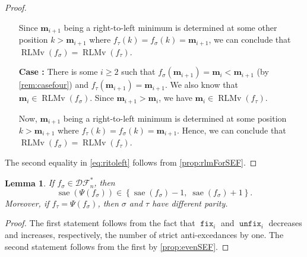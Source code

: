 \documentclass[reqno]{amsart}
\newtheorem{lemma}[theorem]{Lemma}
\theoremstyle{definition}
\newcommand{\DSEF}{\mathcal{DF}}%
\newcommand{\fretherD}{\Psi}
\newcommand{\img}{\mathbf{m}}
\DeclareMathOperator{\RLMv}{RLMv}
\DeclareMathOperator{\aexc}{sae} %
\DeclareMathOperator{\fixMap}{\mathtt{fix}}
\DeclareMathOperator{\unfixMap}{\mathtt{unfix}}
\begin{document}
\begin{proof}
\begin{enumerate}[leftmargin=2cm]
	Since $\img_{i+1}$ being a right-to-left minimum is determined at some other
	position $k>\img_{i+1}$ where $f_\tau(k)=f_\sigma(k)=\img_{i+1}$,
	we can conclude that $\RLMv(f_\sigma)=\RLMv(f_\tau)$.
	
	\item[\textbf{Case \caseFour[i]:}]
	There is some $i\geq 2$ such that $f_\sigma(\img_{i+1})=\img_i<\img_{i+1}$ (by \cref{rem:casefour})
	and $f_\tau(\img_{i+1})=\img_{i+1}$.
	We also know that $\img_i\in\RLMv(f_\sigma)$. 
	Since $\img_{i+1}>\img_i$, we have $\img_i\in\RLMv(f_\tau)$.
	
	Now, $\img_{i+1}$ being a right-to-left minimum
	is determined at some position $k>\img_{i+1}$ where 
	$f_\tau(k)=f_\sigma(k)=\img_{i+1}$.
	Hence, we can conclude that $\RLMv(f_\sigma)=\RLMv(f_\tau)$.
	\end{enumerate}
The second equality in \eqref{eq:ritoleft} follows  from \cref{prop:rlmForSEF}.
\end{proof}


\begin{lemma}\label{lem:signReversing}
If $f_{\sigma}\in \DSEF^*_n$, then 
\[
 \aexc(\fretherD(f_{\sigma})) \in \left\{ \aexc(f_{\sigma})-1,\; \aexc(f_{\sigma})+1 \right\}.
\]
Moreover, if $f_\tau = \fretherD(f_{\sigma})$,
then $\sigma$ and $\tau$ have different parity.
\end{lemma}
\begin{proof}
The first statement follows from the fact that $\fixMap_i$
and $\unfixMap_i$ decreases and increases, respectively, 
the number of strict anti-excedances by one.
The second statement follows from the first by \cref{prop:evenSEF}.
\end{proof}
\end{document}
